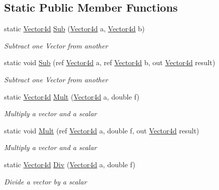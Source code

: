\subsection*{Static Public Member Functions}
\begin{DoxyCompactItemize}
\item 
static \hyperlink{struct_open_t_k_1_1_vector4d}{Vector4d} \hyperlink{struct_open_t_k_1_1_vector4d_a68dd7771103e7beab452d6f4cb4c065e}{Sub} (\hyperlink{struct_open_t_k_1_1_vector4d}{Vector4d} a, \hyperlink{struct_open_t_k_1_1_vector4d}{Vector4d} b)
\begin{DoxyCompactList}\small\item\em Subtract one Vector from another \end{DoxyCompactList}\item 
static void \hyperlink{struct_open_t_k_1_1_vector4d_acc7e8880c2090a709c3f4f0530f41cb1}{Sub} (ref \hyperlink{struct_open_t_k_1_1_vector4d}{Vector4d} a, ref \hyperlink{struct_open_t_k_1_1_vector4d}{Vector4d} b, out \hyperlink{struct_open_t_k_1_1_vector4d}{Vector4d} result)
\begin{DoxyCompactList}\small\item\em Subtract one Vector from another \end{DoxyCompactList}\item 
static \hyperlink{struct_open_t_k_1_1_vector4d}{Vector4d} \hyperlink{struct_open_t_k_1_1_vector4d_abcc672eb4d782329147d2777550031e6}{Mult} (\hyperlink{struct_open_t_k_1_1_vector4d}{Vector4d} a, double f)
\begin{DoxyCompactList}\small\item\em Multiply a vector and a scalar \end{DoxyCompactList}\item 
static void \hyperlink{struct_open_t_k_1_1_vector4d_a8342a4e0faa02e7b0debb31ab940766e}{Mult} (ref \hyperlink{struct_open_t_k_1_1_vector4d}{Vector4d} a, double f, out \hyperlink{struct_open_t_k_1_1_vector4d}{Vector4d} result)
\begin{DoxyCompactList}\small\item\em Multiply a vector and a scalar \end{DoxyCompactList}\item 
static \hyperlink{struct_open_t_k_1_1_vector4d}{Vector4d} \hyperlink{struct_open_t_k_1_1_vector4d_a5862c78d249d7f60654ae3ff942e96e4}{Div} (\hyperlink{struct_open_t_k_1_1_vector4d}{Vector4d} a, double f)
\begin{DoxyCompactList}\small\item\em Divide a vector by a scalar \end{DoxyCompactList}\item 

\end{DoxyCompactItemize}
